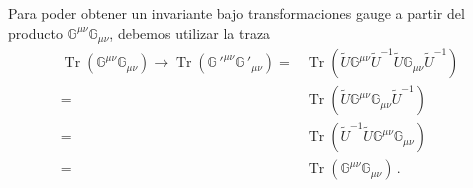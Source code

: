 \begin{frame}
Para poder obtener un invariante bajo transformaciones gauge a partir del producto $\mathbb{G}^{\mu\nu}\mathbb{G}_{\mu\nu}$, debemos utilizar la traza 
\begin{align}
  \operatorname{Tr}\left(\mathbb{G}^{\mu\nu}\mathbb{G}_{\mu\nu}\right)\to
  \operatorname{Tr}\left({\mathbb{G}\,'}^{\mu\nu}{\mathbb{G}\,'}_{\mu\nu}\right)
  =&\operatorname{Tr}\left(\widetilde{U}{{\mathbb{G}}}^{\mu\nu}\widetilde{U}^{-1}\widetilde{U}{{\mathbb{G}}}_{\mu\nu}\widetilde{U}^{-1}\right)\nonumber\\
  =&\operatorname{Tr}\left(\widetilde{U}{{\mathbb{G}}}^{\mu\nu}{{\mathbb{G}}}_{\mu\nu}\widetilde{U}^{-1}\right)\nonumber\\
  =&\operatorname{Tr}\left(\widetilde{U}^{-1}\widetilde{U}{{\mathbb{G}}}^{\mu\nu}{{\mathbb{G}}}_{\mu\nu}\right)\nonumber\\
  =&\operatorname{Tr}\left({{\mathbb{G}}}^{\mu\nu}{{\mathbb{G}}}_{\mu\nu}\right)\,.
\end{align}
\end{frame}

